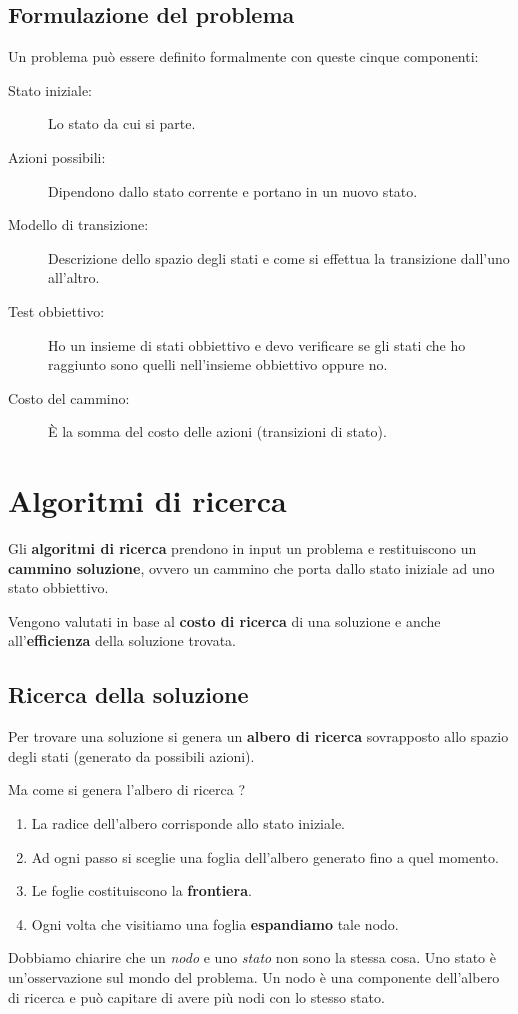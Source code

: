 \subsection{Formulazione del problema}
Un problema pu\`o essere definito formalmente con queste cinque componenti:
\begin{description}
	\item[Stato iniziale:] Lo stato da cui si parte.
	\item[Azioni possibili:] Dipendono dallo stato corrente e portano in un nuovo stato.
	\item[Modello di transizione:] Descrizione dello spazio degli stati e come si effettua
		la transizione dall'uno all'altro.
	\item[Test obbiettivo:] Ho un insieme di stati obbiettivo e devo verificare se gli stati
		che ho raggiunto sono quelli nell'insieme obbiettivo oppure no.
	\item[Costo del cammino:] \`E la somma del costo delle azioni (transizioni di stato).
\end{description}

\section{Algoritmi di ricerca}
Gli \textbf{algoritmi di ricerca} prendono in input un problema e restituiscono un
\textbf{cammino soluzione}, ovvero un cammino che porta dallo stato iniziale ad uno stato
obbiettivo.

Vengono valutati in base al \textbf{costo di ricerca} di una soluzione e anche
all'\textbf{efficienza} della soluzione trovata.

\subsection{Ricerca della soluzione}
Per trovare una soluzione si genera un \textbf{albero di ricerca} sovrapposto allo spazio
degli stati (generato da possibili azioni).

Ma come si genera l'albero di ricerca ?
\begin{enumerate}
	\item La radice dell'albero corrisponde allo stato iniziale.
	\item Ad ogni passo si sceglie una foglia dell'albero generato fino a quel momento.
	\item Le foglie costituiscono la \textbf{frontiera}.
	\item Ogni volta che visitiamo una foglia \textbf{espandiamo} tale nodo.
\end{enumerate}
Dobbiamo chiarire che un \emph{nodo} e uno \emph{stato} non sono la stessa cosa. Uno stato
\`e un'osservazione sul mondo del problema. Un nodo \`e una componente dell'albero di
ricerca e pu\`o capitare di avere pi\`u nodi con lo stesso stato.

